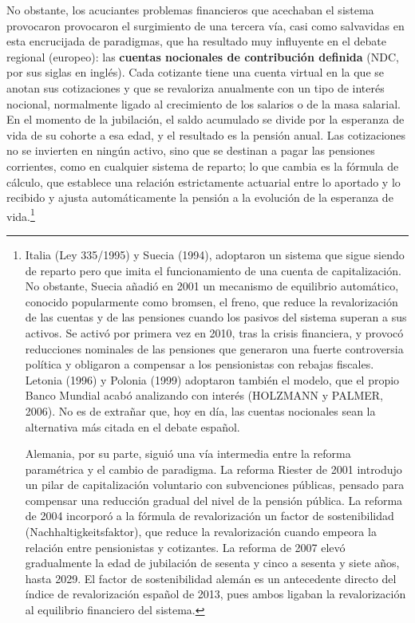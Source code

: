 \documentclass[10pt,a4paper]{article}
\begin{document}
No obstante, los acuciantes problemas financieros que acechaban el sistema provocaron provocaron el surgimiento de una tercera vía, casi como salvavidas en esta encrucijada de paradigmas, que ha resultado muy influyente en el debate regional (europeo): las \textbf{cuentas nocionales de contribución definida} (NDC, por sus siglas en inglés). Cada cotizante tiene una cuenta virtual en la que se anotan sus cotizaciones y que se revaloriza anualmente con un tipo de interés nocional, normalmente ligado al crecimiento de los salarios o de la masa salarial. En el momento de la jubilación, el saldo acumulado se divide por la esperanza de vida de su cohorte a esa edad, y el resultado es la pensión anual. Las cotizaciones no se invierten en ningún activo, sino que se destinan a pagar las pensiones corrientes, como en cualquier sistema de reparto; lo que cambia es la fórmula de cálculo, que establece una relación estrictamente actuarial entre lo aportado y lo recibido y ajusta automáticamente la pensión a la evolución de la esperanza de vida.\footnote{Italia (Ley 335/1995) y Suecia (1994), adoptaron un sistema que sigue siendo de reparto pero que imita el funcionamiento de una cuenta de capitalización. No obstante, Suecia añadió en 2001 un mecanismo de equilibrio automático, conocido popularmente como bromsen, el freno, que reduce la revalorización de las cuentas y de las pensiones cuando los pasivos del sistema superan a sus activos. Se activó por primera vez en 2010, tras la crisis financiera, y provocó reducciones nominales de las pensiones que generaron una fuerte controversia política y obligaron a compensar a los pensionistas con rebajas fiscales. Letonia (1996) y Polonia (1999) adoptaron también el modelo, que el propio Banco Mundial acabó analizando con interés (HOLZMANN y PALMER, 2006). No es de extrañar que, hoy en día, las cuentas nocionales sean la alternativa más citada en el debate español.

Alemania, por su parte, siguió una vía intermedia entre la reforma paramétrica y el cambio de paradigma. La reforma Riester de 2001 introdujo un pilar de capitalización voluntario con subvenciones públicas, pensado para compensar una reducción gradual del nivel de la pensión pública. La reforma de 2004 incorporó a la fórmula de revalorización un factor de sostenibilidad (Nachhaltigkeitsfaktor), que reduce la revalorización cuando empeora la relación entre pensionistas y cotizantes. La reforma de 2007 elevó gradualmente la edad de jubilación de sesenta y cinco a sesenta y siete años, hasta 2029. El factor de sostenibilidad alemán es un antecedente directo del índice de revalorización español de 2013, pues ambos ligaban la revalorización al equilibrio financiero del sistema.
}
\end{document}
